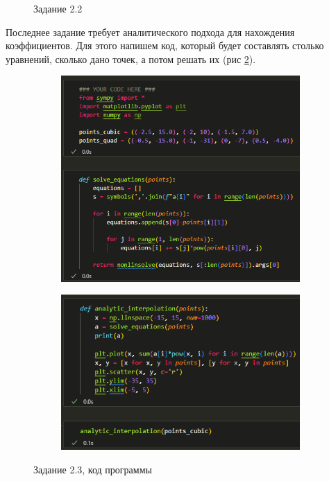 \documentclass[14pt,a4paper]{extarticle}
\begin{document}
\begin{figure}[h!]
    \caption{Задание 2.2}
    \label{fig:2.2}
\end{figure}

        Последнее задание требует аналитического подхода для нахождения
коэффициентов. Для этого напишем код, который будет составлять столько
уравнений, сколько дано точек, а потом решать их (рис \ref{fig:2.3-code}).

\begin{figure}[h!]
    \begin{subfigure}{.5\textwidth}
        \centering
        \includegraphics[width=0.9\linewidth]{figures/2.3-code1.png}
    \end{subfigure}%
    \begin{subfigure}{.5\textwidth}
        \centering
        \includegraphics[width=0.9\linewidth]{figures/2.3-code2.png}
    \end{subfigure}

    \caption{Задание 2.3, код программы}
    \label{fig:2.3-code}
\end{figure}
\end{document}

